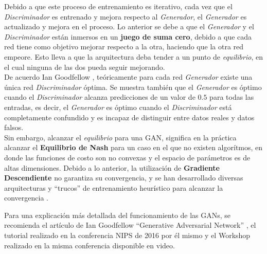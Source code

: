 Debido a que este proceso de entrenamiento es iterativo, cada vez que el \emph{Discriminador} es entrenado
y mejora respecto al \emph{Generador}, el \emph{Generador} es actualizado y mejora en el proceso.
Lo anterior se debe a que el \emph{Generador} y el \emph{Discriminador} están inmersos en un \textbf{juego de suma cero}, debido
a que cada red tiene como objetivo mejorar respecto a la otra, haciendo que la otra red empeore. Esto lleva
a que la arquitectura deba tender a un punto de \emph{equilibrio}, en el cual ninguna de las dos pueda seguir mejorando.\\
De acuerdo Ian Goodfellow \cite{goodfellowGenerativeAdversarialNetworks2014}, teóricamente para cada red \emph{Generador}
existe una única red \emph{Discriminador} óptima. Se muestra también que el \emph{Generador} es óptimo cuando el
\emph{Discriminador} alcanza predicciones de un valor de $0.5$ para todas las entradas, es decir, el \emph{Generador}
es óptimo cuando el \emph{Discriminador} está completamente confundido y es incapaz de distinguir entre datos reales
y datos falsos.\\
Sin embargo, alcanzar el \emph{equilibrio} para una GAN, significa en la práctica alcanzar el \textbf{Equilibrio de Nash} para
un caso en el que no existen algorítmos, en donde las funciones de costo son no convexas y el espacio de parámetros es de
altas dimensiones. Debido a lo anterior, la utilización de \textbf{Gradiente Descendiente} no garantiza su convergencia,
y se han desarrollado diversas arquitecturas \cite{creswellGenerativeAdversarialNetworks2018} y ``trucos'' de entrenamiento
heurístico para alcanzar la convergencia \cite{salimansImprovedTechniquesTraining2016}.

Para una explicación más detallada del funcionamiento de las GANs, se recomienda el artículo de
Ian Goodfellow ``Generative Adversarial Network'' \cite{goodfellowGenerativeAdversarialNetworks2014}, el tutorial
realizado en la conferencia NIPS de 2016 por él mismo \cite{goodfellowNIPS2016Tutorial2017} y el Workshop
realizado en la misma conferencia disponible en video.



